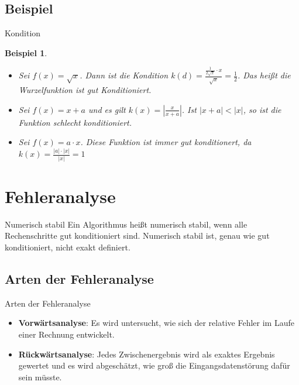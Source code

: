 \documentclass{beamer}
\newtheorem{beispiel}[satz]{Beispiel}
\begin{document}
  \subsection{Beispiel}  
     \begin{frame}{Kondition}
         \begin{beispiel}
           \begin{itemize}
             \item Sei $f(x)= \sqrt{x}$. Dann ist die Kondition $k(d)= \frac{\frac{1}{2 \sqrt{x}} \cdot x}{\sqrt{x}}= \frac{1}{2}$. Das heißt die Wurzelfunktion ist gut Konditioniert. 
             \item Sei $f(x)= x+a$ und es gilt $k(x)= |\frac{x}{x+a}|$. Ist $|x+a|<|x|$, so ist die Funktion schlecht konditioniert. 
             \item Sei $f(x)= a \cdot x$. Diese Funktion ist immer gut konditionert, da $k(x)= \frac{|a| \cdot |x|}{|x|}=1$
          \end{itemize}
       \label{kondition}
      \end{beispiel}
     \end{frame}

\section{Fehleranalyse}     
   \begin{frame}{Numerisch stabil}
       Ein Algorithmus heißt numerisch stabil, wenn alle Rechenschritte gut konditioniert sind. Numerisch stabil ist, genau wie gut konditioniert, nicht exakt definiert. 
   \end{frame}

   \subsection{Arten der Fehleranalyse}
     \begin{frame}{Arten der Fehleranalyse}
         \begin{itemize}
           \item \textbf{Vorwärtsanalyse}: Es wird untersucht, wie sich der relative Fehler im Laufe einer Rechnung entwickelt.
           \item \textbf{Rückwärtsanalyse}: Jedes Zwischenergebnis wird als exaktes Ergebnis gewertet und es wird abgeschätzt, wie groß die Eingangsdatenstörung dafür sein müsste. 
        \end{itemize}
     \end{frame}
\end{document}
